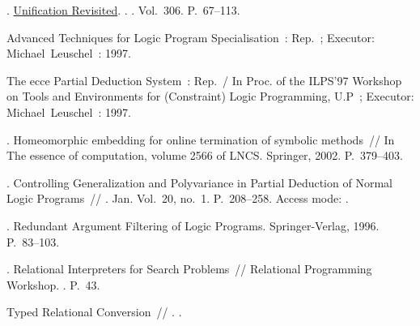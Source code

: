 \begin{thebibliography}{10}
  .
    \href{http://dx.doi.org/10.1007/3-540-19129-1_4}{Unification Revisited}.
    \BibDash
  . . \BibDash
  \newblock Vol.~306. \BibDash
  \newblock P.~67--113.

  Advanced Techniques for Logic Program Specialisation~: Rep.~; Executor:
    Michael~Leuschel~: 1997.

  The ecce Partial Deduction System~: Rep.~/ In Proc. of the ILPS'97 Workshop on
    Tools and Environments for (Constraint) Logic Programming, U.P~; Executor:
    Michael~Leuschel~: 1997.

  . Homeomorphic embedding for online termination of
    symbolic methods~// In The essence of computation, volume 2566 of LNCS.
    \BibDash
  \newblock Springer, 2002. \BibDash
  \newblock P.~379--403.

  . Controlling
    Generalization and Polyvariance in Partial Deduction of Normal Logic
    Programs~// \href{http://dx.doi.org/10.1145/271510.271525}{} \BibDash
  . \BibDash Jan. \BibDash
  \newblock Vol.~20, no.~1. \BibDash
  \newblock P.~208–258. \BibDash
  \newblock Access mode: .

  . Redundant Argument
    Filtering of Logic Programs. \BibDash
  \newblock Springer-Verlag, 1996. \BibDash
  \newblock P.~83--103.

  . Relational
    Interpreters for Search Problems~// Relational Programming Workshop. \BibDash
  . \BibDash
  \newblock P.~43.

   Typed Relational Conversion~//
    . \BibDash
  .


\end{thebibliography}
